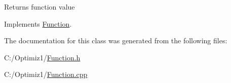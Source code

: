 Returns function value 

Implements \hyperlink{class_function_ae9243748f484eb1135e55120fb0ccdea}{Function}.



The documentation for this class was generated from the following files\+:\begin{DoxyCompactItemize}
\item 
C\+:/\+Optimiz1/\hyperlink{_function_8h}{Function.\+h}\item 
C\+:/\+Optimiz1/\hyperlink{_function_8cpp}{Function.\+cpp}\end{DoxyCompactItemize}
